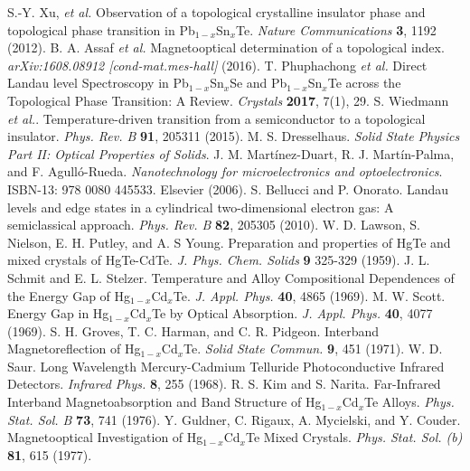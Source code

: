 \documentclass[titlepage,a4paper]{book}
\begin{document}
\begin{thebibliography}{199}
S.-Y. Xu, \textit{et al.} Observation of a topological crystalline insulator phase and topological phase transition in Pb$_{1-x}$Sn$_{x}$Te. \textit{Nature Communications} \textbf{3}, 1192 (2012).
B. A. Assaf \textit{et al.} Magnetooptical determination of a topological index. \textit{arXiv:1608.08912 [cond-mat.mes-hall]} (2016).
T. Phuphachong  \textit{et al.} Direct Landau level Spectroscopy in Pb$_{1-x}$Sn$_x$Se and Pb$_{1-x}$Sn$_x$Te across the Topological Phase Transition: A Review. \textit{Crystals} \textbf{2017}, 7(1), 29.
S. Wiedmann \textit{et al.}. Temperature-driven transition from a semiconductor to a topological insulator. \textit{Phys. Rev. B} \textbf{91}, 205311 (2015).
M. S. Dresselhaus. \textit{Solid State Physics Part II: Optical Properties of Solids}.
J. M. Martínez-Duart, R. J. Martín-Palma, and F. Agulló-Rueda. \textit{Nanotechnology for microelectronics and optoelectronics}. ISBN-13: 978 0080 445533. Elsevier (2006).
S. Bellucci and P. Onorato. Landau levels and edge states in a cylindrical two-dimensional electron gas: A semiclassical approach. \textit{Phys. Rev. B} \textbf{82}, 205305 (2010).
W. D. Lawson, S. Nielson, E. H. Putley, and A. S Young. Preparation and properties of HgTe and mixed crystals of HgTe-CdTe. \textit{J. Phys. Chem. Solids} \textbf{9} 325-329 (1959).
J. L. Schmit and E. L. Stelzer. Temperature and Alloy Compositional Dependences of the Energy Gap of Hg$_{1-x}$Cd$_x$Te. \textit{J. Appl. Phys.} \textbf{40}, 4865 (1969).
M. W. Scott. Energy Gap in Hg$_{1-x}$Cd$_x$Te by Optical Absorption. \textit{J. Appl. Phys.} \textbf{40}, 4077 (1969).
S. H. Groves, T. C. Harman, and C. R. Pidgeon. Interband Magnetoreflection of Hg$_{1-x}$Cd$_x$Te. \textit{Solid State Commun.} \textbf{9}, 451 (1971).
W. D. Saur. Long Wavelength Mercury-Cadmium Telluride Photoconductive Infrared Detectors. \textit{Infrared Phys.} \textbf{8}, 255 (1968).
R. S. Kim and S. Narita. Far-Infrared Interband Magnetoabsorption and Band Structure of Hg$_{1-x}$Cd$_x$Te Alloys. \textit{Phys. Stat. Sol. B} \textbf{73}, 741 (1976).
Y. Guldner, C. Rigaux, A. Mycielski, and Y. Couder. Magnetooptical Investigation of Hg$_{1-x}$Cd$_x$Te Mixed Crystals. \textit{Phys. Stat. Sol. (b)} \textbf{81}, 615 (1977).

\end{thebibliography}
\end{document}
